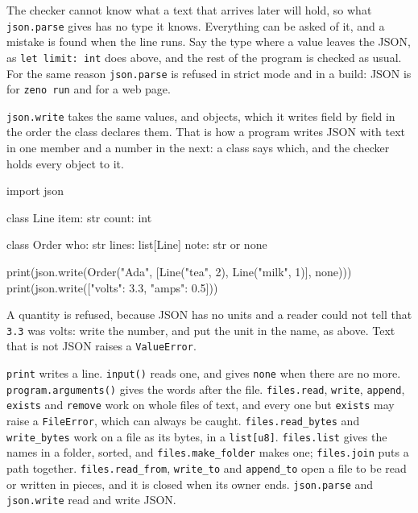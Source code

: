 The checker cannot know what a text that arrives later will hold, so
what \verb|json.parse| gives has no type it knows. Everything can be
asked of it, and a mistake is found when the line runs. Say the type
where a value leaves the JSON, as \verb|let limit: int| does above,
and the rest of the program is checked as usual. For the same reason
\verb|json.parse| is refused in strict mode and in a build: JSON is for
\verb|zeno run| and for a web page.

\verb|json.write| takes the same values, and objects, which it writes
field by field in the order the class declares them. That is how a
program writes JSON with text in one member and a number in the next:
a class says which, and the checker holds every object to it.

\begin{zeno}[file=order.zeno, dir=json]
import json

class Line {
    item: str
    count: int
}

class Order {
    who: str
    lines: list[Line]
    note: str or none
}

print(json.write(Order("Ada", [Line("tea", 2), Line("milk", 1)], none)))
print(json.write(["volts": 3.3, "amps": 0.5]))
\end{zeno}

A quantity is refused, because JSON has no units and a reader could
not tell that \verb|3.3| was volts: write the number, and put the unit
in the name, as above. Text that is not JSON raises a
\verb|ValueError|.

\begin{summary}
\verb|print| writes a line. \verb|input()| reads one, and gives
\verb|none| when there are no more. \verb|program.arguments()| gives
the words after the file. \verb|files.read|, \verb|write|,
\verb|append|, \verb|exists| and \verb|remove| work on whole files of
text, and every one but \verb|exists| may raise a \verb|FileError|,
which can always be caught. \verb|files.read_bytes| and
\verb|write_bytes| work on a file as its bytes, in a \verb|list[u8]|.
\verb|files.list| gives the names in a folder, sorted, and
\verb|files.make_folder| makes one; \verb|files.join| puts a path
together. \verb|files.read_from|, \verb|write_to| and
\verb|append_to| open a file to be read or written in pieces, and it is
closed when its owner ends. \verb|json.parse| and \verb|json.write| read and write
JSON.
\end{summary}

